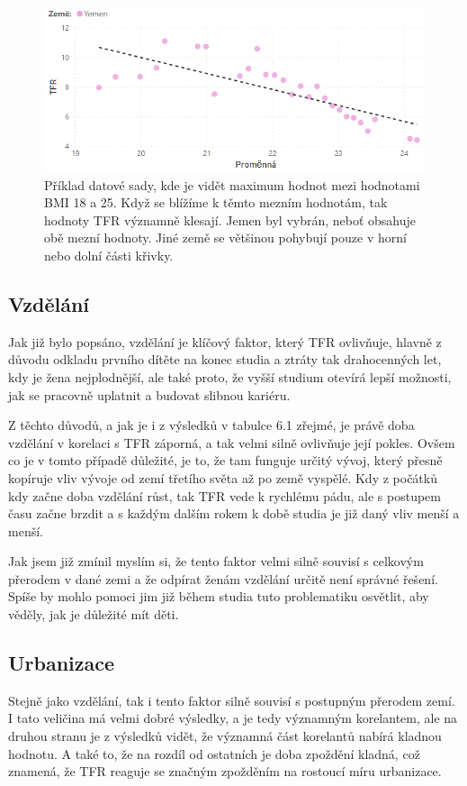 \documentclass[thesis=M,czech]{FITthesis}[2022/10/08]
\begin{document}
\begin{figure}
    \centering
    \includegraphics[width=\textwidth]{DP-obrazky/BMI.png}
    \caption{Příklad datové sady, kde je vidět maximum hodnot mezi hodnotami BMI 18 a 25. Když se blížíme k těmto mezním hodnotám, tak hodnoty TFR významně klesají. Jemen byl vybrán, neboť obsahuje obě mezní hodnoty. Jiné země se většinou pohybují pouze v horní nebo dolní části křivky.}
    \label{fig:BMI_Yemen}
\end{figure}

\subsection{Vzdělání}
Jak již bylo popsáno, vzdělání je klíčový faktor, který TFR ovlivňuje, hlavně z důvodu odkladu prvního dítěte na konec studia a ztráty tak drahocenných let, kdy je žena nejplodnější, ale také proto, že vyšší studium otevírá lepší možnosti, jak se pracovně uplatnit a budovat slibnou kariéru. 

Z těchto důvodů, a jak je i z výsledků v tabulce 6.1 zřejmé, je právě doba vzdělání v korelaci s TFR záporná, a tak velmi silně ovlivňuje její pokles. Ovšem co je v tomto případě důležité, je to, že tam funguje určitý vývoj, který přesně kopíruje vliv vývoje od zemí třetího světa až po země vyspělé. Kdy z počátků kdy začne doba vzdělání růst, tak TFR vede k rychlému pádu, ale s postupem času začne brzdit a s každým dalším rokem k době studia je již daný vliv menší a menší. 

Jak jsem již zmínil myslím si, že tento faktor velmi silně souvisí s celkovým přerodem v dané zemi a že odpírat ženám vzdělání určitě není správné řešení. Spíše by mohlo pomoci jim již během studia tuto problematiku osvětlit, aby věděly, jak je důležité mít děti.

\subsection{Urbanizace}
Stejně jako vzdělání, tak i tento faktor silně souvisí s postupným přerodem zemí. I tato veličina má velmi dobré výsledky, a je tedy významným korelantem, ale na druhou stranu je z výsledků vidět, že významná část korelantů nabírá kladnou hodnotu. A také to, že na rozdíl od ostatních je doba zpoždění kladná, což znamená, že TFR reaguje se značným zpožděním na rostoucí míru urbanizace. 
\end{document}
